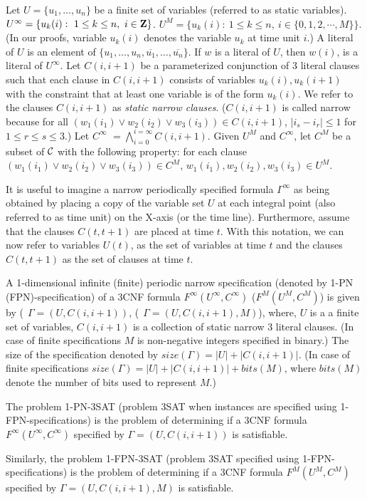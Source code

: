 Let $U = \{u_1, \ldots, u_n \}$  be a finite set of variables (referred to
as static variables).
$U^{\infty} =  \{u_k(i): ~ 1 \leq k \leq n, ~ i \in {\bf Z}\}$. 
$U^{M} =  \{u_k(i): ~ 1 \leq k \leq n, ~ i \in \{0,1, 2, \cdots, M\}\}$. 
(In our proofs, variable $u_k(i)$
denotes the variable $u_k$ at time unit $i$.) 
A literal of $U$ is an element of 
$\{u_1, \ldots, u_n, \overline{u_1}, \ldots, \overline{u_n} \}$.
If $w$ is a literal of $U$, then $w(i)$, 
is a literal of $U^{\infty}$.
Let $C(i, i+1)$ be a parameterized conjunction of 3 literal clauses
such that each clause in $C(i, i+1)$ 
consists of variables $u_k(i), u_k(i+1)$ with the constraint that at least one
variable is of the form $u_k(i)$. 
We refer to the clauses $C(i, i+1)$ as  {\em static narrow clauses}. 
($C(i, i+1)$ is called  narrow because
for all  $(w_1(i_1) \vee w_2(i_2) \vee w_3(i_3)) \in C(i,i+1) $, 
$|i_s - i_r| \leq 1$ for $1 \leq r \leq s \leq 3$.)
Let $C^{\infty}$ $= \bigwedge_{i = 0}^{i =\infty}C(i, i+1)$. 
Given $U^{M}$ and $C^{\infty}$, let $C^{M}$ be a subset of $\cal C$ 
with the following property: for each clause 
$(w_1(i_1) \vee w_2(i_2) \vee w_3(i_3))  \in C^{M}$,
$ w_1(i_1), w_2(i_2), w_3(i_3) \in U^{M}$.



It is useful to imagine a narrow periodically specified formula
$\Gamma^{\infty}$ as being obtained by placing a copy of the variable 
set $U$
at each integral point (also referred to as time unit) 
on the X-axis (or the time line). 
Furthermore, assume that the clauses $C(t, t+1)$ are placed at time $t$.
With this notation, we can now refer to variables $U(t)$,
as the set of variables at time $t$ 
and the clauses $C(t, t+1)$ as the set of clauses at time $t$.




\begin{definition}\label{fpn:sat}
A 1-dimensional infinite (finite) 
periodic narrow specification (denoted by 1-PN (FPN)-specification)
of a  3CNF formula  $F^{\infty}(U^{\infty}, C^{\infty})$
($F^{M}(U^{M}, C^{M})$) is given by 
($~~\Gamma = (U,C(i,i+1))$,  ($~~\Gamma = (U,C(i, i+1), M)$),  
where, $U$ is a  a finite set of variables,
$C(i, i+1)$ is a collection of static narrow 3 literal clauses. 
(In case of finite specifications $M$ is non-negative integers 
specified in binary.)
The size of the specification denoted by 
$size(\Gamma) = |U| + |C(i, i+1)| $. (In case of finite specifications
$size(\Gamma) =|U| + |C(i, i+1)| + bits(M)$,  
where $bits(M)$ denote the number
of bits used to represent $M$.)


The problem 1-PN-3SAT (problem 3SAT when instances are specified using 
1-FPN-specifications)  is the problem of determining if a 3CNF formula
$F^{\infty}(U^{\infty}, C^{\infty})$ specified by $\Gamma= (U,C(i, i+1))$ 
is satisfiable.

Similarly, the problem 1-FPN-3SAT (problem 3SAT specified using 
1-FPN-specifications)  is the problem of determining if a 3CNF formula
$F^{M}(U^{M}, C^{M})$ specified by $\Gamma= (U,C(i, i+1),M)$ 
is satisfiable.
\end{definition}


